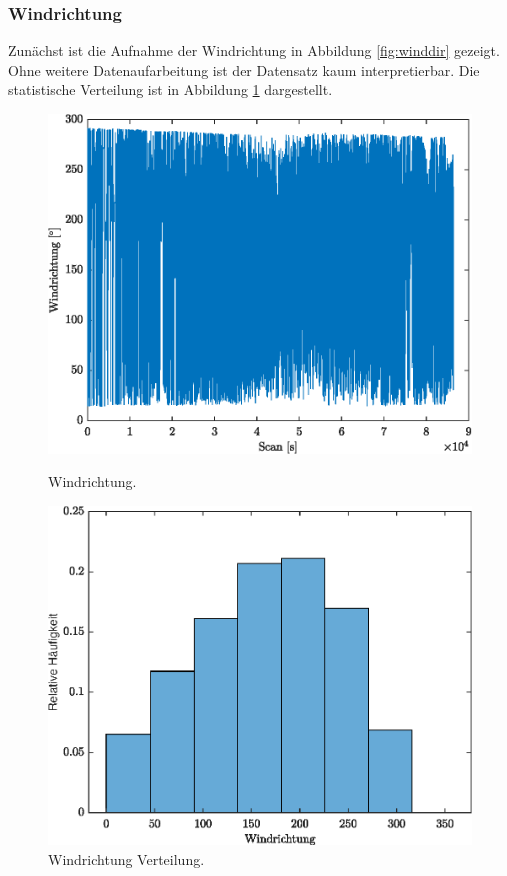 \subsubsection{Windrichtung}

Zunächst ist die Aufnahme der Windrichtung in Abbildung \ref{fig:winddir} gezeigt. Ohne weitere Datenaufarbeitung ist der Datensatz kaum interpretierbar. Die statistische Verteilung ist in Abbildung \ref{fig:winddirCN} dargestellt.
\begin{figure}[H]
	\centering
	\begin{minipage}[t]{0.45\textwidth}
		\centering
		\includegraphics[width=\textwidth]{../DATA/Windrichtung.eps}
		\caption[Windrichtung]{Windrichtung.}
		\label{fig:winddir}
	\end{minipage}
	\hfill
	\begin{minipage}[t]{0.45\textwidth}
		\centering
		\centering
		\includegraphics[width=\textwidth]{../DATA/WinddirCN.eps}
		\caption[Windrichtung Verteilung]{Windrichtung Verteilung.}
		\label{fig:winddirCN}
	\end{minipage}
\end{figure}

